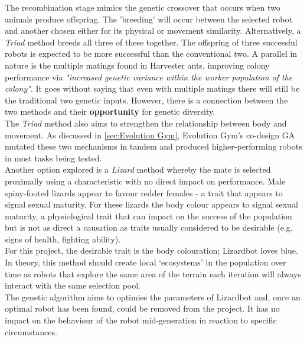 \documentclass{article}
\begin{document}
The recombination stage mimics the genetic crossover that occurs when two animals produce offspring. The 'breeding' will occur between the selected robot and another chosen either for its physical or movement similarity. Alternatively, a \textit{Triad} method breeds all three of these together. The offspring of three successful robots is expected to be more successful than the conventional two. A parallel in nature is the multiple matings found in Harvester ants, improving colony performance via \textit{"increased genetic variance within the worker population of the colony"}.  It goes without saying that even with multiple matings there will still be the traditional two genetic inputs. However, there is a connection between the two methods and their \textbf{opportunity} for genetic diversity. \\
The \textit{Triad} method also aims to strengthen the relationship between body and movement. As discussed in \ref{sec:Evolution Gym}, Evolution Gym's co-design GA mutated these two mechanisms in tandem and produced higher-performing robots in most tasks being tested. \\

Another option explored is a \textit{Lizard} method whereby the mate is selected proximally using a characteristic with no direct impact on performance. Male spiny-footed lizards appear to favour redder females - a trait that appears to signal sexual maturity.   For these lizards the body colour appears to signal sexual maturity, a physiological trait that can impact on the success of the population but is not as direct a causation as traits usually considered to be desirable (e.g. signs of health, fighting ability). \\
For this project, the desirable trait is the body colouration; Lizardbot loves blue. In theory, this method should create local ‘ecosystems’ in the population over time as robots that explore the same area of the terrain each iteration will always interact with the same selection pool. \\

The genetic algorithm aims to optimise the parameters of Lizardbot and, once an optimal robot has been found, could be removed from the project. It has no impact on the behaviour of the robot mid-generation in reaction to specific circumstances.\\
\end{document}
